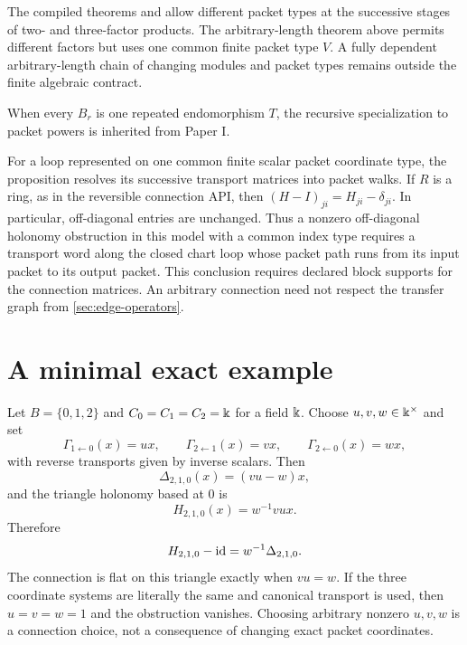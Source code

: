 \begin{boundary}
The compiled theorems
 and
 allow different packet
types at the successive stages of two- and three-factor products.  The
arbitrary-length theorem above permits different factors but uses one common
finite packet type $V$.  A fully dependent arbitrary-length chain of changing
modules and packet types remains outside the finite algebraic contract.
\end{boundary}

\begin{remark}
When every $B_r$ is one repeated endomorphism $T$, the recursive
specialization to packet powers is inherited from Paper I.
\end{remark}

For a loop represented on one common finite scalar packet coordinate type,
the proposition resolves its successive transport matrices into packet
walks.  If $R$ is a ring, as in the reversible connection API, then
$(H-I)_{ji}=H_{ji}-\delta_{ji}$.  In particular, off-diagonal entries are
unchanged.  Thus a nonzero off-diagonal holonomy obstruction in this model
with a common index type requires a transport word along the closed chart
loop whose packet path runs from its input packet to its output packet.  This
conclusion requires declared block supports for the connection matrices.
An arbitrary connection need not respect the transfer graph from
\cref{sec:edge-operators}.

\section{A minimal exact example}
\label{sec:example}

\begin{example}
Let $B=\{0,1,2\}$ and $C_0=C_1=C_2=\Bbbk$ for a field $\Bbbk$.  Choose
$u,v,w\in\Bbbk^\times$ and set
\[
\Gamma_{1\leftarrow0}(x)=ux,\qquad
\Gamma_{2\leftarrow1}(x)=vx,\qquad
\Gamma_{2\leftarrow0}(x)=wx,
\]
with reverse transports given by inverse scalars.  Then
\[
\Delta_{2,1,0}(x)=(vu-w)x,
\]
and the triangle holonomy based at $0$ is
\[
H_{2,1,0}(x)=w^{-1}vux.
\]
Therefore
\[
H_{2,1,0}-\mathrm{id}
=w^{-1}\Delta_{2,1,0}.
\]
The connection is flat on this triangle exactly when $vu=w$.  If the three
coordinate systems are literally the same and canonical transport is used,
then $u=v=w=1$ and the obstruction vanishes.  Choosing arbitrary nonzero
$u,v,w$ is a connection choice, not a consequence of changing exact packet
coordinates.
\end{example}

